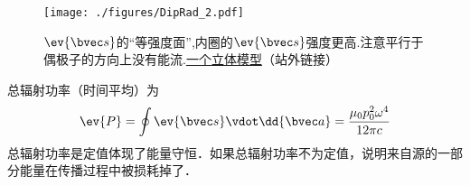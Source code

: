 \begin{figure}[ht]
\centering
\texttt{[image: ./figures/DipRad\_2.pdf]}
\caption{$\ev{\bvec s}$的“等强度面”,内圈的$\ev{\bvec s}$强度更高.注意平行于偶极子的方向上没有能流.\href{https://www.geogebra.org/m/semmtxm5}{一个立体模型}（站外链接）} \label{DipRad_fig2}
\end{figure}
总辐射功率（时间平均）为
\begin{equation}
\ev{P} = \oint \ev{\bvec s} \vdot \dd{\bvec a} = \frac{\mu_0 p_0^2 \omega^4}{12\pi c}
\end{equation}
总辐射功率是定值体现了能量守恒．如果总辐射功率不为定值，说明来自源的一部分能量在传播过程中被损耗掉了．
